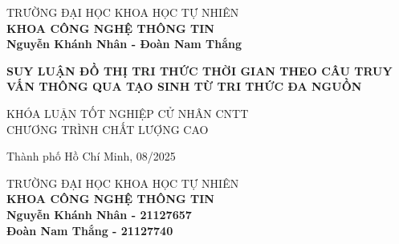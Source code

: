 \begin{titlepage}

\begin{center}
TRƯỜNG ĐẠI HỌC KHOA HỌC TỰ NHIÊN\\
\textbf{KHOA CÔNG NGHỆ THÔNG TIN}\\[2cm]


{ \Large \bfseries Nguyễn Khánh Nhân - Đoàn Nam Thắng\\[2cm] } 


{ \Large \bfseries SUY LUẬN ĐỒ THỊ TRI THỨC THỜI
GIAN THEO CÂU TRUY VẤN THÔNG QUA TẠO SINH TỪ TRI THỨC ĐA
NGUỒN \\[3cm]} 


\normalsize KHÓA LUẬN TỐT NGHIỆP CỬ NHÂN CNTT\\
\normalsize CHƯƠNG TRÌNH CHẤT LƯỢNG CAO\\



\vfill
Thành phố Hồ Chí Minh, 08/2025

\end{center}

\pagebreak



\begin{center}

TRƯỜNG ĐẠI HỌC KHOA HỌC TỰ NHIÊN\\
\textbf{KHOA CÔNG NGHỆ THÔNG TIN}\\[2cm]


{\large \bfseries Nguyễn Khánh Nhân - 21127657\\} 
{\large \bfseries Đoàn Nam Thắng - 21127740\\[2cm]}


\end{center}
\end{titlepage}
